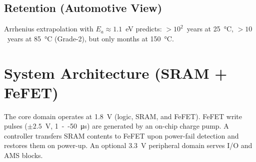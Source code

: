 \documentclass[conference]{IEEEtran}
\begin{document}
\subsection{Retention (Automotive View)}
Arrhenius extrapolation with \(E_a\approx 1.1\)~eV predicts:
\(>\!10^{2}\)~years at \SI{25}{\celsius}, \(>\!10\)~years at \SI{85}{\celsius} (Grade-2), but only months at \SI{150}{\celsius}.

\section{System Architecture (SRAM + FeFET)}
The core domain operates at \SI{1.8}{V} (logic, SRAM, and FeFET). FeFET write pulses (\(\pm 2.5\)~V, \SI{1}{--}\SI{50}{\micro s}) are generated by an on-chip charge pump. A controller transfers SRAM contents to FeFET upon power-fail detection and restores them on power-up. An optional \SI{3.3}{V} peripheral domain serves I/O and AMS blocks.

\end{document}
